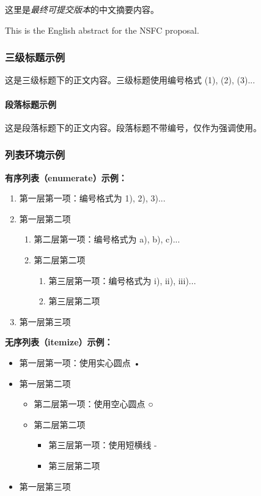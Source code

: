 \documentclass[UTF8,zihao=-4]{ctexart} %
\begin{document}
   \mnsfcTitlePage
   \begin{mnsfcAbstractZH}
     这里是\emph{最终可提交版本}的中文摘要内容。
   \end{mnsfcAbstractZH}

   \begin{mnsfcAbstractEN}
     This is the English abstract for the NSFC proposal.
   \end{mnsfcAbstractEN}

  \zhlipsum[1-2]
   \subsubsection{三级标题示例}
   这是三级标题下的正文内容。三级标题使用编号格式 (1), (2), (3)...

   \paragraph{段落标题示例}
   这是段落标题下的正文内容。段落标题不带编号，仅作为强调使用。

   \subsubsection{列表环境示例}

   \textbf{有序列表（enumerate）示例：}
   \begin{enumerate}
     \item 第一层第一项：编号格式为 1), 2), 3)...
     \item 第一层第二项
     \begin{enumerate}
       \item 第二层第一项：编号格式为 a), b), c)...
       \item 第二层第二项
       \begin{enumerate}
         \item 第三层第一项：编号格式为 i), ii), iii)...
         \item 第三层第二项
       \end{enumerate}
     \end{enumerate}
     \item 第一层第三项
   \end{enumerate}

   \textbf{无序列表（itemize）示例：}
   \begin{itemize}
     \item 第一层第一项：使用实心圆点 •
     \item 第一层第二项
     \begin{itemize}
       \item 第二层第一项：使用空心圆点 ○
       \item 第二层第二项
       \begin{itemize}
         \item 第三层第一项：使用短横线 -
         \item 第三层第二项
       \end{itemize}
     \end{itemize}
     \item 第一层第三项
   \end{itemize}
\end{document}
